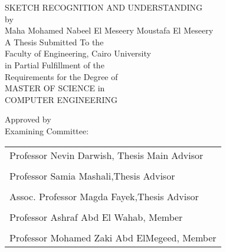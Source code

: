 \documentclass[12pt,onehalfspacing]{SketchThesis}
\begin{document}
                                                      
\begin{center}     
SKETCH RECOGNITION AND UNDERSTANDING\\
\normalsize by      \\ 
Maha Mohamed Nabeel El Meseery Moustafa El Meseery\\
\vspace*{0.2cm}        
A Thesis Submitted To the\\
Faculty of Engineering, Cairo University\\
in Partial Fulfillment of the\\
Requirements for the Degree of\\
MASTER OF SCIENCE
in\\
COMPUTER ENGINEERING\\
\end{center}         
Approved by\\                                           
Examining Committee:\\ \vspace*{0.2cm} 
\begin{tabular*}{0.9\textwidth}{l   }
\\ \hline 
Professor Nevin Darwish, Thesis Main Advisor\\ \\  \hline  
Professor Samia Mashali,Thesis Advisor \\  \\ \hline   
Assoc. Professor Magda Fayek,Thesis Advisor\\  \\  \hline  
Professor  Ashraf Abd El Wahab, Member\\ \\ \hline  
Professor Mohamed Zaki Abd ElMegeed, Member\\  

		\end{tabular*}
\end{document}
